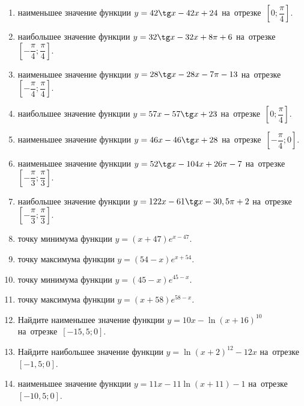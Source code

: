 \documentclass[a4paper,10pt]{article}
\begin{document}
\begin{enumerate}
\item {} наименьшее значение функции $y = 42\tg x-42x+24$ на~отрезке~$\left[0;\dfrac{\pi }{4}\right]$.

\item {} наибольшее значение функции $y=32\tg x-32x+8\pi +6$ на~отрезке~$\left[-\dfrac{\pi }{4};\dfrac{\pi }{4}\right]$.

\item {} наименьшее значение функции $y=28\tg x-28x-7\pi -13$ на~отрезке~$\left[-\dfrac{\pi }{4};\dfrac{\pi }{4}\right]$.

\item {} наибольшее значение функции $y = 57x-57\tg x +23$ на~отрезке~$\left[0;\dfrac{\pi }{4}\right]$.

\item {} наименьшее значение функции $y = 46x-46\tg x +28$ на~отрезке~$\left[-\dfrac{\pi }{4};0\right]$.

\item {} наименьшее значение функции $y = 52\tg x-104x+26 \pi -7$ на~отрезке~$\left[-\dfrac{\pi }{3};\dfrac{\pi }{3}\right]$.

\item {} наибольшее значение функции $y = 122x-61\tg x-30,5\pi +2$ на~отрезке~$\left[-\dfrac{\pi }{3};\dfrac{\pi }{3}\right]$.

\item {} точку минимума функции $y = \left(x+47\right)e^{x-47}$.

\item {} точку максимума функции $y = \left(54-x\right)e^{x+54}$.

\item {} точку минимума функции $y = \left(45-x\right)e^{45-x}$.

\item {} точку максимума функции $y = \left(x+58\right)e^{58-x}$.

\item Найдите наименьшее значение функции $y = 10x-\ln \left(x+16\right)^{10}$ на~отрезке~$\left[-15,5;0\right]$.

\item Найдите наибольшее значение функции $y = \ln \left(x+2\right)^{12}-12x$ на~отрезке~$\left[-1,5;0\right]$.

\item {} наименьшее значение функции $y = 11x-11\ln \left(x+11\right) -1$ на~отрезке~$\left[-10,5;0\right]$.


\end{enumerate}
\end{document}
